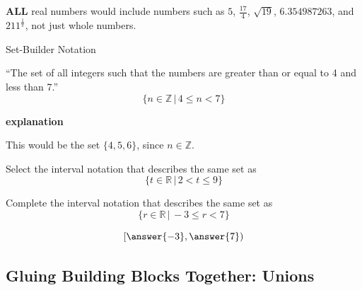 \documentclass{ximera}
\begin{document}
\begin{warning}
\textbf{\textcolor{red!70!black}{ALL}} real numbers would include numbers such as $5$, $\frac{17}{4}$, $\sqrt{19}$, $6.354987263$, and $211^{\tfrac{1}{\pi}}$, not just whole numbers.
\end{warning}



\begin{example} Set-Builder Notation

``The set of all integers such that the numbers are greater than or equal to 4 and less than 7.''
\[ \{ n \in \mathbb {Z} \, | \, 4 \leq n < 7 \} \]


\textbf{\textcolor{red!75!green}{explanation}} 

This would be the set $\{ 4, 5, 6 \}$, since $n \in \mathbb {Z}$. 

\end{example}




\begin{question}

Select the interval notation that describes the same set as 
\[ \{ t \in \mathbb {R} \, | \, 2 < t \leq 9 \} \]
	\begin{multipleChoice}
	\choice {$[9, 2)$}
	\choice {$[2, 9)$}
	\choice [correct]{$(2, 9]$}
	\choice {$[2, 9]$}
	\end{multipleChoice}
\end{question}





\begin{question}

Complete the interval notation that describes the same set as 
\[ \{ r \in \mathbb {R} \, | \, -3 \leq r < 7 \} \]

\[
\left [ \answer{-3} , \answer{7} \right )
\]



\end{question}




















\subsection*{Gluing Building Blocks Together: Unions}
\end{document}
